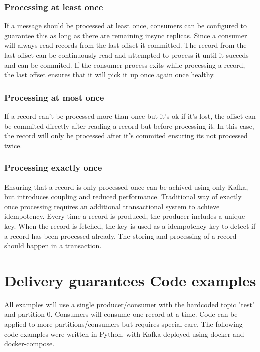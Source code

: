 \documentclass[11pt]{article}
\begin{document}
\subsubsection{Processing at least once}
If a message should be processed at least once, consumers can be configured to guarantee this as long as there are remaining insync replicas. Since a consumer will always read records from the last offset it committed. 
\newline
\newline
The record from the last offset can be continuously read and attempted to process it until it succeds and can be commited. If the consumer process exits while processing a record, the last offset ensures that it will pick it up once again once healthy.

\subsubsection{Processing at most once}
If a record can't be processed more than once but it's ok if it's lost, the offset can be commited directly after reading a record but before processing it. In this case, the record will only be processed after it's commited ensuring its not processed twice.

\subsubsection{Processing exactly once}
Ensuring that a record is only processed once can be achived using only Kafka, but introduces coupling and reduced performance. Traditional way of exactly once processing requires an additional transactional system to achieve idempotency. Every time a record is produced, the producer includes a unique key. When the record is fetched, the key is used as a idempotency key to detect if a record has been processed already. The storing and processing of a record should happen in a transaction.

\clearpage
\section{Delivery guarantees Code examples}

All examples will use a single producer/consumer with the hardcoded topic "test" and partition 0.
Consumers will consume one record at a time. Code can be applied to more partitions/consumers but requires special care. The following code examples were written in Python, with Kafka deployed using docker and docker-compose.
\end{document}
